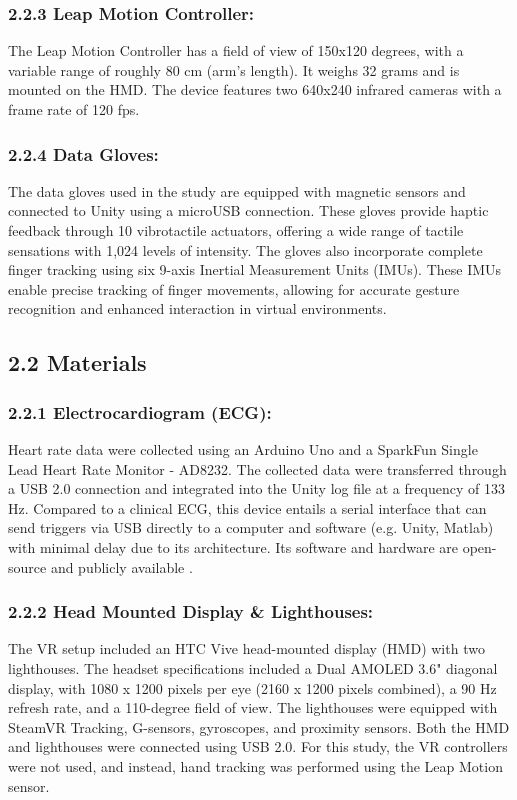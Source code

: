 \documentclass[12pt,oneside,openright]{report}
\begin{document}
\subsubsection*{2.2.3 Leap Motion Controller:}
The Leap Motion Controller has a field of view of 150x120 degrees, with a variable range of roughly 80 cm (arm's length). It weighs 32 grams and is mounted on the HMD. The device features two 640x240 infrared cameras with a frame rate of 120 fps.

\subsubsection*{2.2.4 Data Gloves:}
The data gloves used in the study are equipped with magnetic sensors and connected to Unity using a microUSB connection. These gloves provide haptic feedback through 10 vibrotactile actuators, offering a wide range of tactile sensations with 1,024 levels of intensity. The gloves also incorporate complete finger tracking using six 9-axis Inertial Measurement Units (IMUs). These IMUs enable precise tracking of finger movements, allowing for accurate gesture recognition and enhanced interaction in virtual environments.

\subsection*{2.2 Materials}
\subsubsection*{2.2.1 Electrocardiogram (ECG):}
Heart rate data were collected using an Arduino Uno and a SparkFun Single Lead Heart Rate Monitor - AD8232. The collected data were transferred through a USB 2.0 connection and integrated into the Unity log file at a frequency of 133 Hz. Compared to a clinical ECG, this device entails a serial interface that can send triggers via USB directly to a computer and software (e.g. Unity, Matlab) with minimal delay due to its architecture. Its software and hardware are open-source and publicly available \parencite{TimsECG}.

\subsubsection*{2.2.2 Head Mounted Display \& Lighthouses:}
The VR setup included an HTC Vive head-mounted display (HMD) with two lighthouses. The headset specifications included a Dual AMOLED 3.6" diagonal display, with 1080 x 1200 pixels per eye (2160 x 1200 pixels combined), a 90 Hz refresh rate, and a 110-degree field of view. The lighthouses were equipped with SteamVR Tracking, G-sensors, gyroscopes, and proximity sensors. Both the HMD and lighthouses were connected using USB 2.0. For this study, the VR controllers were not used, and instead, hand tracking was performed using the Leap Motion sensor.
\end{document}
